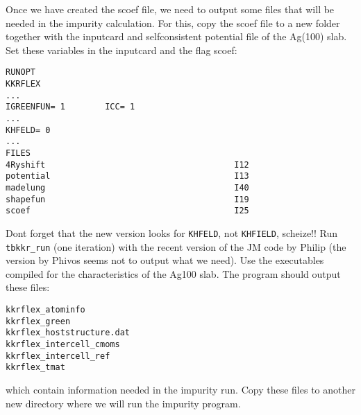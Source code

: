 \documentclass[11pt,fleqn]{book} %
\begin{document}
Once we have created the scoef file,
we need to output some files that will be needed in the impurity calculation.
For this, copy the scoef file to a new folder together with the inputcard
and selfconsistent potential file of the Ag(100) slab.
Set these variables in the inputcard and the flag scoef:

\begin{VBox}
\begin{verbatim}
RUNOPT
KKRFLEX
...
IGREENFUN= 1        ICC= 1
...
KHFELD= 0
...
FILES
4Ryshift                                      I12
potential                                     I13
madelung                                      I40
shapefun                                      I19
scoef                                         I25
\end{verbatim}
\end{VBox}
Dont forget that the new version looks for \verb|KHFELD|, not \verb|KHFIELD|, scheize!!
Run \verb|tbkkr_run| (one iteration) with the recent version of the JM code by Philip
(the version by Phivos seems not to output what we need).
Use the executables compiled for the characteristics of the Ag100 slab.
The program should output these files:
\begin{VBox}
\begin{verbatim}
kkrflex_atominfo
kkrflex_green
kkrflex_hoststructure.dat
kkrflex_intercell_cmoms
kkrflex_intercell_ref
kkrflex_tmat
\end{verbatim}
\end{VBox}
which contain information needed in the impurity run.
Copy these files to another new directory where we will run the impurity program.
\end{document}

